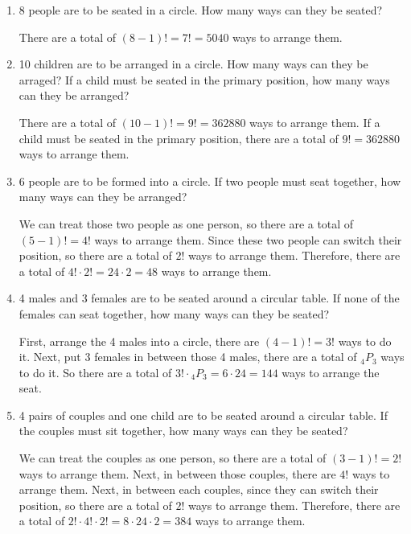 \documentclass{report}
\newcommand\permtwo[2][^n]{{}_{#1}P_{#2}}
\begin{document}
\begin{multicols}{2}
  \begin{enumerate}
    \item 8 people are to be seated in a circle. How many ways can they be seated?
          \sol{}

          There are a total of $(8-1)! = 7! = 5040$ ways to arrange them.

    \item 10 children are to be arranged in a circle. How many ways can they be
          arraged? If a child must be seated in the primary position, how many ways can they be arranged?
          \sol{}

          There are a total of $(10-1)! = 9! = 362880$ ways to arrange them. If a child
          must be seated in the primary position, there are a total of $9! = 362880$ ways
          to arrange them.

    \item 6 people are to be formed into a circle. If two people must seat together, how many ways can they be arranged?
          \sol{}

          We can treat those two people as one person, so there are a total of $(5-1)! =
            4!$ ways to arrange them. Since these two people can switch their position, so
          there are a total of $2!$ ways to arrange them. Therefore, there are a total of
          $4! \cdot 2! = 24 \cdot 2 = 48$ ways to arrange them.

    \item 4 males and 3 females are to be seated around a circular table. If none of the females can seat together, how many ways can they be seated?
          \sol{}

          First, arrange the 4 males into a circle, there are $(4-1)! = 3!$ ways to do
          it. Next, put 3 females in between those 4 males, there are a total of
          $\permtwo[4]{3}$ ways to do it. So there are a total of $3! \cdot
            \permtwo[4]{3} = 6 \cdot 24 = 144$ ways to arrange the seat.

    \item 4 pairs of couples and one child are to be seated around a circular table. If the couples must sit together, how many ways can they be seated?
          \sol{}

          We can treat the couples as one person, so there are a total of $(3-1)! = 2!$
          ways to arrange them. Next, in between those couples, there are $4!$ ways to
          arrange them. Next, in between each couples, since they can switch their
          position, so there are a total of $2!$ ways to arrange them. Therefore, there
          are a total of $2! \cdot 4! \cdot 2! = 8 \cdot 24 \cdot 2 = 384$ ways to
          arrange them.


\end{enumerate}
\end{multicols}
\end{document}

